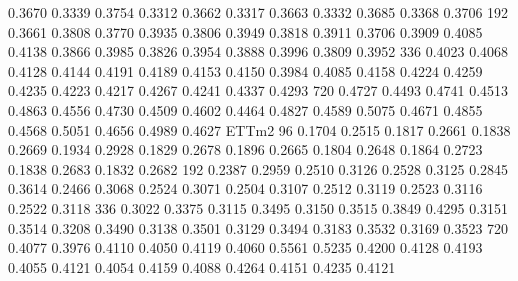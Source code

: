 \documentclass[
]{article}
\begin{document}
0.3670 0.3339 0.3754 0.3312 0.3662 0.3317 0.3663 0.3332 0.3685 0.3368
0.3706 192 0.3661 0.3808 0.3770 0.3935 0.3806 0.3949 0.3818 0.3911
0.3706 0.3909 0.4085 0.4138 0.3866 0.3985 0.3826 0.3954 0.3888 0.3996
0.3809 0.3952 336 0.4023 0.4068 0.4128 0.4144 0.4191 0.4189 0.4153
0.4150 0.3984 0.4085 0.4158 0.4224 0.4259 0.4235 0.4223 0.4217 0.4267
0.4241 0.4337 0.4293 720 0.4727 0.4493 0.4741 0.4513 0.4863 0.4556
0.4730 0.4509 0.4602 0.4464 0.4827 0.4589 0.5075 0.4671 0.4855 0.4568
0.5051 0.4656 0.4989 0.4627 ETTm2 96 0.1704 0.2515 0.1817 0.2661 0.1838
0.2669 0.1934 0.2928 0.1829 0.2678 0.1896 0.2665 0.1804 0.2648 0.1864
0.2723 0.1838 0.2683 0.1832 0.2682 192 0.2387 0.2959 0.2510 0.3126
0.2528 0.3125 0.2845 0.3614 0.2466 0.3068 0.2524 0.3071 0.2504 0.3107
0.2512 0.3119 0.2523 0.3116 0.2522 0.3118 336 0.3022 0.3375 0.3115
0.3495 0.3150 0.3515 0.3849 0.4295 0.3151 0.3514 0.3208 0.3490 0.3138
0.3501 0.3129 0.3494 0.3183 0.3532 0.3169 0.3523 720 0.4077 0.3976
0.4110 0.4050 0.4119 0.4060 0.5561 0.5235 0.4200 0.4128 0.4193 0.4055
0.4121 0.4054 0.4159 0.4088 0.4264 0.4151 0.4235 0.4121
\end{document}
